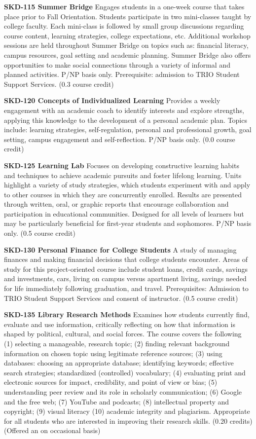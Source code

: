 \documentclass[
  letterpaper,
]{scrbook}
\begin{document}
\textbf{SKD-115 Summer Bridge} Engages students in a one-week course
that takes place prior to Fall Orientation. Students participate in two
mini-classes taught by college faculty. Each mini-class is followed by
small group discussions regarding course content, learning strategies,
college expectations, etc. Additional workshop sessions are held
throughout Summer Bridge on topics such as: financial literacy, campus
resources, goal setting and academic planning. Summer Bridge also offers
opportunities to make social connections through a variety of informal
and planned activities. P/NP basis only. Prerequisite: admission to TRIO
Student Support Services. (0.3 course credit)

\textbf{SKD-120 Concepts of Individualized Learning} Provides a weekly
engagement with an academic coach to identify interests and explore
strengths, applying this knowledge to the development of a personal
academic plan. Topics include: learning strategies, self-regulation,
personal and professional growth, goal setting, campus engagement and
self-reflection. P/NP basis only. (0.0 course credit)

\textbf{SKD-125 Learning Lab} Focuses on developing constructive
learning habits and techniques to achieve academic pursuits and foster
lifelong learning. Units highlight a variety of study strategies, which
students experiment with and apply to other courses in which they are
concurrently enrolled. Results are presented through written, oral, or
graphic reports that encourage collaboration and participation in
educational communities. Designed for all levels of learners but may be
particularly beneficial for first-year students and sophomores. P/NP
basis only. (0.5 course credit)

\textbf{SKD-130 Personal Finance for College Students} A study of
managing finances and making financial decisions that college students
encounter. Areas of study for this project-oriented course include
student loans, credit cards, savings and investments, cars, living on
campus versus apartment living, savings needed for life immediately
following graduation, and travel. Prerequisites: Admission to TRIO
Student Support Services and consent of instructor. (0.5 course credit)

\textbf{SKD-135 Library Research Methods} Examines how students
currently find, evaluate and use information, critically reflecting on
how that information is shaped by political, cultural, and social
forces. The course covers the following (1) selecting a manageable,
research topic; (2) finding relevant background information on chosen
topic using legitimate reference sources; (3) using databases: choosing
an appropriate database; identifying keywords; effective search
strategies; standardized (controlled) vocabulary; (4) evaluating print
and electronic sources for impact, credibility, and point of view or
bias; (5) understanding peer review and its role in scholarly
communication; (6) Google and the free web; (7) YouTube and podcasts;
(8) intellectual property and copyright; (9) visual literacy (10)
academic integrity and plagiarism. Appropriate for all students who are
interested in improving their research skills. (0.20 credits) (Offered
an on occasional basis)
\end{document}
